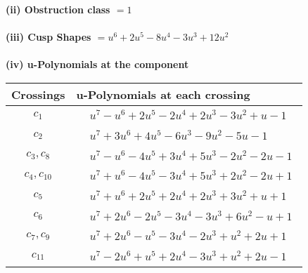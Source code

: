 \documentclass[1p]{elsarticle_modified}
\theoremstyle{definition}
\begin{document}
\flushleft \textbf{(ii) Obstruction class $= 1$}\\~\\
\flushleft \textbf{(iii) Cusp Shapes $= u^6+2 u^5-8 u^4-3 u^3+12 u^2$}\\~\\
\newpage\renewcommand{\arraystretch}{1}
\flushleft \textbf{(iv) u-Polynomials at the component}\newline \\
\begin{tabular}{m{50pt}|m{274pt}}
Crossings & \hspace{64pt}u-Polynomials at each crossing \\
\hline $$\begin{aligned}c_{1}\end{aligned}$$&$\begin{aligned}
&u^7- u^6+2 u^5-2 u^4+2 u^3-3 u^2+u-1
\end{aligned}$\\
\hline $$\begin{aligned}c_{2}\end{aligned}$$&$\begin{aligned}
&u^7+3 u^6+4 u^5-6 u^3-9 u^2-5 u-1
\end{aligned}$\\
\hline $$\begin{aligned}c_{3},c_{8}\end{aligned}$$&$\begin{aligned}
&u^7- u^6-4 u^5+3 u^4+5 u^3-2 u^2-2 u-1
\end{aligned}$\\
\hline $$\begin{aligned}c_{4},c_{10}\end{aligned}$$&$\begin{aligned}
&u^7+u^6-4 u^5-3 u^4+5 u^3+2 u^2-2 u+1
\end{aligned}$\\
\hline $$\begin{aligned}c_{5}\end{aligned}$$&$\begin{aligned}
&u^7+u^6+2 u^5+2 u^4+2 u^3+3 u^2+u+1
\end{aligned}$\\
\hline $$\begin{aligned}c_{6}\end{aligned}$$&$\begin{aligned}
&u^7+2 u^6-2 u^5-3 u^4-3 u^3+6 u^2- u+1
\end{aligned}$\\
\hline $$\begin{aligned}c_{7},c_{9}\end{aligned}$$&$\begin{aligned}
&u^7+2 u^6- u^5-3 u^4-2 u^3+u^2+2 u+1
\end{aligned}$\\
\hline $$\begin{aligned}c_{11}\end{aligned}$$&$\begin{aligned}
&u^7-2 u^6+u^5+2 u^4-3 u^3+u^2+2 u-1
\end{aligned}$\\
\hline
\end{tabular}\\~\\
\end{document}
